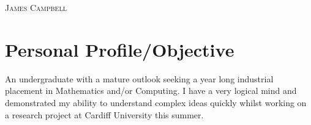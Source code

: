 \documentclass[a4paper, 11pt]{article}
\begin{document}
\pagestyle{empty} %
\begin{multicols}{2}

\raggedright{\textsc{\Huge{James Campbell}}}\\
\columnbreak
{}

\end{multicols}
\section{Personal Profile/Objective}
An undergraduate with a mature outlook seeking a year long industrial placement in Mathematics and/or Computing. I have a very logical mind and demonstrated my ability to understand complex ideas quickly whilst working on a research project at Cardiff University this summer.

\end{document}
